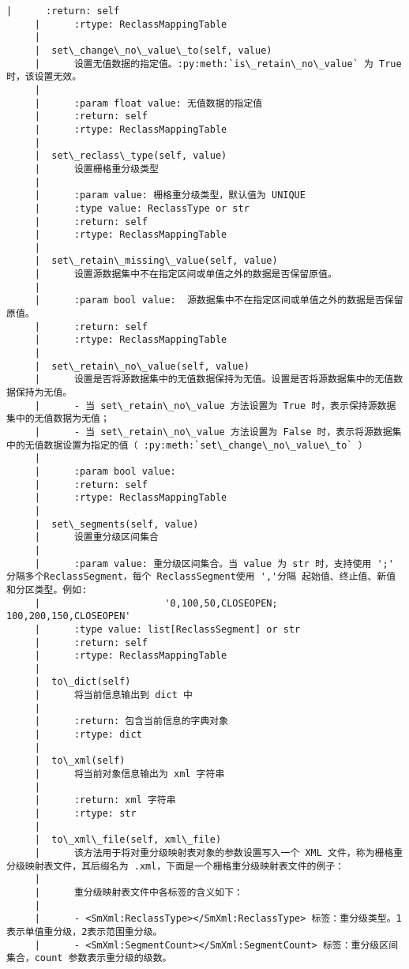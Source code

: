 \documentclass[11pt]{article}
\begin{document}
\begin{Verbatim}[commandchars=\\\{\}]
     |      :return: self
     |      :rtype: ReclassMappingTable
     |  
     |  set\_change\_no\_value\_to(self, value)
     |      设置无值数据的指定值。:py:meth:`is\_retain\_no\_value` 为 True 时，该设置无效。
     |      
     |      :param float value: 无值数据的指定值
     |      :return: self
     |      :rtype: ReclassMappingTable
     |  
     |  set\_reclass\_type(self, value)
     |      设置栅格重分级类型
     |      
     |      :param value: 栅格重分级类型，默认值为 UNIQUE
     |      :type value: ReclassType or str
     |      :return: self
     |      :rtype: ReclassMappingTable
     |  
     |  set\_retain\_missing\_value(self, value)
     |      设置源数据集中不在指定区间或单值之外的数据是否保留原值。
     |      
     |      :param bool value:  源数据集中不在指定区间或单值之外的数据是否保留原值。
     |      :return: self
     |      :rtype: ReclassMappingTable
     |  
     |  set\_retain\_no\_value(self, value)
     |      设置是否将源数据集中的无值数据保持为无值。设置是否将源数据集中的无值数据保持为无值。
     |      - 当 set\_retain\_no\_value 方法设置为 True 时，表示保持源数据集中的无值数据为无值；
     |      - 当 set\_retain\_no\_value 方法设置为 False 时，表示将源数据集中的无值数据设置为指定的值（ :py:meth:`set\_change\_no\_value\_to` ）
     |      
     |      :param bool value:
     |      :return: self
     |      :rtype: ReclassMappingTable
     |  
     |  set\_segments(self, value)
     |      设置重分级区间集合
     |      
     |      :param value: 重分级区间集合。当 value 为 str 时，支持使用 ';' 分隔多个ReclassSegment，每个 ReclassSegment使用 ','分隔 起始值、终止值、新值和分区类型。例如:
     |                      '0,100,50,CLOSEOPEN; 100,200,150,CLOSEOPEN'
     |      :type value: list[ReclassSegment] or str
     |      :return: self
     |      :rtype: ReclassMappingTable
     |  
     |  to\_dict(self)
     |      将当前信息输出到 dict 中
     |      
     |      :return: 包含当前信息的字典对象
     |      :rtype: dict
     |  
     |  to\_xml(self)
     |      将当前对象信息输出为 xml 字符串
     |      
     |      :return: xml 字符串
     |      :rtype: str
     |  
     |  to\_xml\_file(self, xml\_file)
     |      该方法用于将对重分级映射表对象的参数设置写入一个 XML 文件，称为栅格重分级映射表文件，其后缀名为 .xml，下面是一个栅格重分级映射表文件的例子：
     |      
     |      重分级映射表文件中各标签的含义如下：
     |      
     |      - <SmXml:ReclassType></SmXml:ReclassType> 标签：重分级类型。1表示单值重分级，2表示范围重分级。
     |      - <SmXml:SegmentCount></SmXml:SegmentCount> 标签：重分级区间集合，count 参数表示重分级的级数。

\end{Verbatim}
\end{document}
